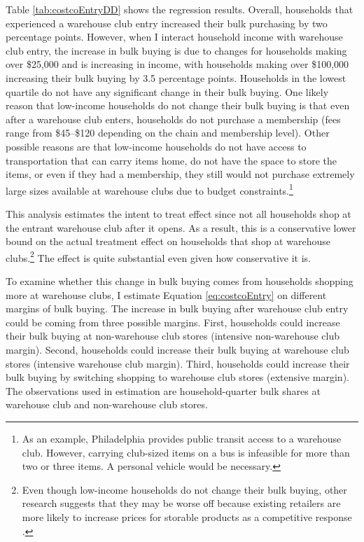 \documentclass[AER]{AEA_mal}
\begin{document}
Table \ref{tab:costcoEntryDD} shows the regression results. Overall, households that experienced a warehouse club entry increased their bulk purchasing by two percentage points. However, when I interact household income with warehouse club entry, the increase in bulk buying is due to changes for households making over \$25,000 and is increasing in income, with households making over \$100,000 increasing their bulk buying by 3.5 percentage points. Households in the lowest quartile do not have any significant change in their bulk buying. One likely reason that low-income households do not change their bulk buying is that even after a warehouse club enters, households do not purchase a membership (fees range from \$45--\$120 depending on the chain and membership level). Other possible reasons are that low-income households do not have access to transportation that can carry items home, do not have the space to store the items, or even if they had a membership, they still would not purchase extremely large sizes available at warehouse clubs due to budget constraints.\footnote{As an example, Philadelphia provides public transit access to a warehouse club. However, carrying club-sized items on a bus is infeasible for more than two or three items. A personal vehicle would be necessary.}



This analysis estimates the intent to treat effect since not all households shop at the entrant warehouse club after it opens. As a result, this is a conservative lower bound on the actual treatment effect on households that shop at warehouse clubs.\footnote{Even though low-income households do not change their bulk buying, other research suggests that they may be worse off because existing retailers are more likely to increase prices for storable products as a competitive response \citep{bauner2019}.} The effect is quite substantial even given how conservative it is.

To examine whether this change in bulk buying comes from households shopping more at warehouse clubs, I estimate Equation \ref{eq:costcoEntry} on different margins of bulk buying. The increase in bulk buying after warehouse club entry could be coming from three possible margins. First, households could increase their bulk buying at non-warehouse club stores (intensive non-warehouse club margin). Second, households could increase their bulk buying at warehouse club stores (intensive warehouse club margin). Third, households could increase their bulk buying by switching shopping to warehouse club stores (extensive margin). The observations used in estimation are household-quarter bulk shares at warehouse club and non-warehouse club stores.
\end{document}
